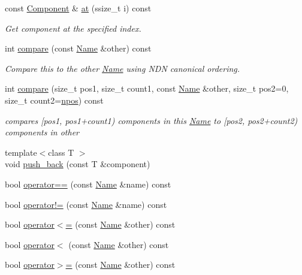 \begin{DoxyCompactItemize}
\item 
const \hyperlink{classndn_1_1name_1_1Component}{Component} \& \hyperlink{classndn_1_1Name_af2cdd3cc2ba50746f4fc3ad29927052c}{at} (ssize\+\_\+t i) const
\begin{DoxyCompactList}\small\item\em Get component at the specified index. \end{DoxyCompactList}\item 
int \hyperlink{classndn_1_1Name_a594a93440100fe2ce70509ad0528fafb}{compare} (const \hyperlink{classndn_1_1Name}{Name} \&other) const
\begin{DoxyCompactList}\small\item\em Compare this to the other \hyperlink{classndn_1_1Name}{Name} using N\+DN canonical ordering. \end{DoxyCompactList}\item 
int \hyperlink{classndn_1_1Name_aefb21d9210b7f4e8d9d5713c8280cb3d}{compare} (size\+\_\+t pos1, size\+\_\+t count1, const \hyperlink{classndn_1_1Name}{Name} \&other, size\+\_\+t pos2=0, size\+\_\+t count2=\hyperlink{classndn_1_1Name_aa53d45ef5e55ed9224b75b4fc99dd692}{npos}) const
\begin{DoxyCompactList}\small\item\em compares \mbox{[}pos1, pos1+count1) components in this \hyperlink{classndn_1_1Name}{Name} to \mbox{[}pos2, pos2+count2) components in {\ttfamily other} \end{DoxyCompactList}\item 
{\footnotesize template$<$class T $>$ }\\void \hyperlink{classndn_1_1Name_ae3c9b981b05b97deecc0f4624678e4f1}{push\+\_\+back} (const T \&component)
\item 
bool \hyperlink{classndn_1_1Name_a3e5960de10977dbe51090b8574fdacd1}{operator==} (const \hyperlink{classndn_1_1Name}{Name} \&name) const
\item 
bool \hyperlink{classndn_1_1Name_ac1a2a14d1594547509fd6081382d35eb}{operator!=} (const \hyperlink{classndn_1_1Name}{Name} \&name) const
\item 
bool \hyperlink{classndn_1_1Name_a8ec700e70d4c738983dc7be03791dae0}{operator$<$=} (const \hyperlink{classndn_1_1Name}{Name} \&other) const
\item 
bool \hyperlink{classndn_1_1Name_aedffacc9dff55b8f7be8e54e7eafa136}{operator$<$} (const \hyperlink{classndn_1_1Name}{Name} \&other) const
\item 
bool \hyperlink{classndn_1_1Name_a3fbf2344b3206a7010d0f3818500cdf8}{operator$>$=} (const \hyperlink{classndn_1_1Name}{Name} \&other) const

\end{DoxyCompactItemize}
